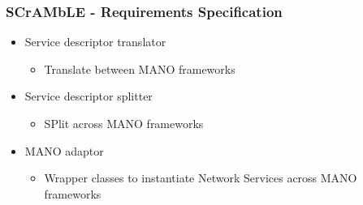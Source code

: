 \begin{frame}
\frametitle{SCrAMbLE - Requirements Specification}
\begin{itemize}
	
	\item Service descriptor translator
	\begin{itemize}
		\item Translate between MANO frameworks
	\end{itemize}
	\item Service descriptor splitter
	\begin{itemize}
		\item SPlit across MANO frameworks
	\end{itemize}
	
	\item MANO adaptor
	\begin{itemize}
		\item Wrapper classes to instantiate Network Services across MANO frameworks
	\end{itemize}
\end{itemize}
\end{frame}
